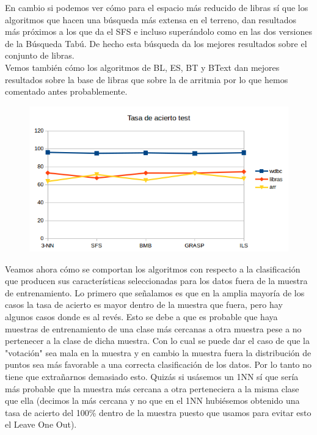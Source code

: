 \documentclass[10pt,a4paper]{article}
\begin{document}
En cambio si podemos ver cómo para el espacio más reducido de libras sí que los algoritmos que hacen una búsqueda más extensa en el terreno, dan resultados más próximos a los que da el SFS e incluso superándolo como en las dos versiones de la Búsqueda Tabú. De hecho esta búsqueda da los mejores resultados sobre el conjunto de libras.\\

Vemos también cómo los algoritmos de BL, ES, BT y BText dan mejores resultados sobre la base de libras que sobre la de arritmia por lo que hemos comentado antes probablemente.\\

\begin{figure}[H]
\centering
\includegraphics[width=130mm]{tasa_test.png}
\end{figure}

Veamos ahora cómo se comportan los algoritmos con respecto a la clasificación que producen sus características seleccionadas para los datos fuera de la muestra de entrenamiento. Lo primero que señalamos es que en la amplia mayoría de los casos la tasa de acierto es mayor dentro de la muestra que fuera, pero hay algunos casos donde es al revés. Esto se debe a que es probable que haya muestras de entrenamiento de una clase más cercanas a otra muestra pese a no pertenecer a la clase de dicha muestra. Con lo cual se puede dar el caso de que la "votación" sea mala en la muestra y en cambio la muestra fuera la distribución de puntos sea más favorable a una correcta clasificación de los datos. Por lo tanto no tiene que extrañarnos demasiado esto. Quizás si usásemos un 1NN sí que sería más probable que la muestra más cercana a otra perteneciera a la misma clase que ella (decimos la más cercana y no que en el 1NN hubiésemos obtenido una tasa de acierto del 100\% dentro de la muestra puesto que usamos para evitar esto el Leave One Out).\\
\end{document}
